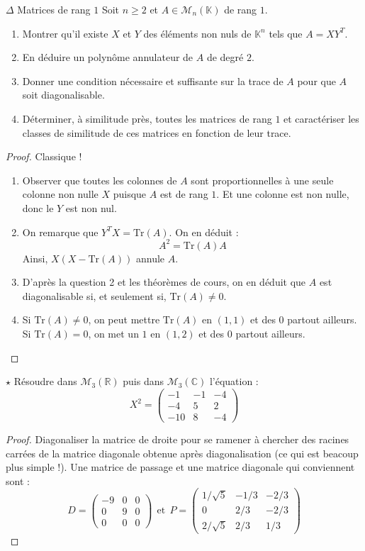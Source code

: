 \documentclass[french,a4paper]{article}
\newcommand{\R}{\mathbb{R}}
\newcommand{\C}{\mathbb{C}}
\newcommand{\K}{\mathbb{K}}
\newcommand{\Tr}{\text{Tr}}
\theoremstyle{plain}
\theoremstyle{definition}
\theoremstyle{remark}
\begin{document}
\begin{ex}{$\Delta$ Matrices de rang $1$}
	Soit $n\geqslant 2$ et $A\in\mathcal{M}_n(\K)$ de rang $1$.
	\begin{enumerate}
		\item Montrer qu'il existe $X$ et $Y$ des éléments non nuls de $\K^n$ tels que $A=XY^T$.
		\item En déduire un polynôme annulateur de $A$ de degré $2$.
		\item Donner une condition nécessaire et suffisante sur la trace de $A$ pour que $A$ soit diagonalisable.
		\item Déterminer, à similitude près, toutes les matrices de rang $1$ et caractériser les classes de similitude de ces matrices en fonction de leur trace.
	\end{enumerate}
\end{ex}
\begin{proof}
	Classique !
	\begin{enumerate}
		\item Observer que toutes les colonnes de $A$ sont proportionnelles à une seule colonne non nulle $X$ puisque $A$ est de rang $1$. Et une colonne est non nulle, donc le $Y$ est non nul.
		\item On remarque que $Y^TX=\Tr(A)$. On en déduit : $$A^2=\Tr(A)A$$ Ainsi, $X(X-\Tr(A))$ annule $A$.
		\item D'après la question 2 et les théorèmes de cours, on en déduit que $A$ est diagonalisable si, et seulement si, $\Tr(A)\ne0$.
		\item Si $\Tr(A)\ne0$, on peut mettre $\Tr(A)$ en $(1,1)$ et des $0$ partout ailleurs. Si $\Tr(A)=0$, on met un $1$ en $(1,2)$ et des $0$ partout ailleurs.
	\end{enumerate}
\end{proof}

\begin{ex}{$\star$}
	Résoudre dans $\mathcal{M}_3(\R)$ puis dans $\mathcal{M}_3(\C)$ l'équation : $$X^2=\begin{pmatrix}
		-1&-1&-4\\
		-4&5&2\\
		-10&8&-4
	\end{pmatrix}$$
\end{ex}
\begin{proof}
	Diagonaliser la matrice de droite pour se ramener à chercher des racines carrées de la matrice diagonale obtenue après diagonalisation (ce qui est beacoup plus simple !). Une matrice de passage et une matrice diagonale qui conviennent sont : $$D=\begin{pmatrix}
		-9&0&0\\
		0&9&0\\
		0&0&0
	\end{pmatrix} \ \ \text{et}\ \ P=\begin{pmatrix}
	1/\sqrt{5}&-1/3&-2/3\\
	0&2/3&-2/3\\
	2/\sqrt{5}&2/3&1/3
	\end{pmatrix}$$
\end{proof}
\end{document}

